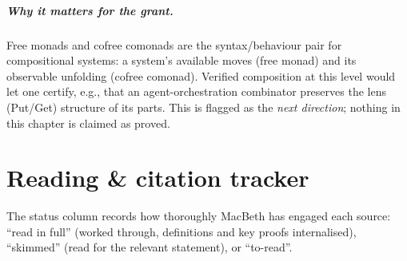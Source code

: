 \documentclass[11pt,a4paper]{book}
\theoremstyle{plain}
\theoremstyle{definition}
\theoremstyle{remark}
\begin{document}
\paragraph{Why it matters for the grant.} Free monads and cofree comonads are the
syntax/behaviour pair for compositional systems: a system's available moves
(free monad) and its observable unfolding (cofree comonad). Verified composition
at this level would let one certify, e.g., that an agent-orchestration combinator
preserves the lens (Put/Get) structure of its parts. This is flagged as the
\emph{next direction}; nothing in this chapter is claimed as proved.

\appendix
\chapter{Reading \& citation tracker}
\label{app:tracker}

The status column records how thoroughly MacBeth has engaged each source: ``read
in full'' (worked through, definitions and key proofs internalised), ``skimmed''
(read for the relevant statement), or ``to-read''.
\end{document}
